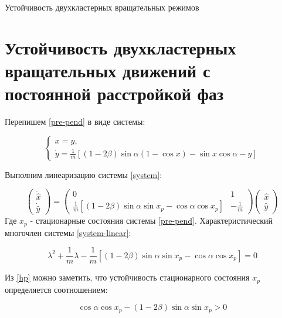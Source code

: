 \begin{chapter}{Устойчивость двухкластерных вращательных режимов}
	\section{Устойчивость двухкластерных вращательных движений с постоянной расстройкой фаз}
	
	Перепишем \ref{pre-pend} в виде системы:
	
	\begin{equation} \label{system}
		\begin{cases}
			\dot{x} = y, \\
			\dot{y} = \frac{1}{m} \left[ (1 - 2\beta)\sin{\alpha}(1 - \cos{x}) - \sin{x}\cos{\alpha} - y \right]
		\end{cases}
	\end{equation}
	
	Выполним линеаризацию системы \ref{system}:
	
	\begin{equation} \label{system-linear}
		\begin{pmatrix}
			\dot{\hat{x}} \\
			\dot{\hat{y}}
		\end{pmatrix}
		=
		\begin{pmatrix}
			0 & 1 \\
			\frac{1}{m}\left[ (1 - 2\beta)\sin{\alpha}\sin{x_p} - \cos{\alpha}\cos{x_p} \right] & -\frac{1}{m}
		\end{pmatrix}
		\begin{pmatrix}
			\hat{x} \\
			\hat{y}
		\end{pmatrix}
	\end{equation}
	Где $x_p$ - стационарные состояния системы \ref{pre-pend}. Характеристический многочлен системы \ref{system-linear}:
	
	\begin{equation} \label{hp}
		\lambda^2 + \frac{1}{m}\lambda - \frac{1}{m}\left[ (1 - 2\beta)\sin{\alpha}\sin{x_p} - \cos{\alpha}\cos{x_p} \right] = 0
	\end{equation}
	
	Из \ref{hp} можно заметить, что устойчивость стационарного состояния $x_p$ определяется соотношением:
	
	\begin{equation} \label{hp-stability}
		\cos{\alpha}\cos{x_p} - (1 - 2\beta)\sin{\alpha}\sin{x_p} > 0
	\end{equation}
	

\end{chapter}
